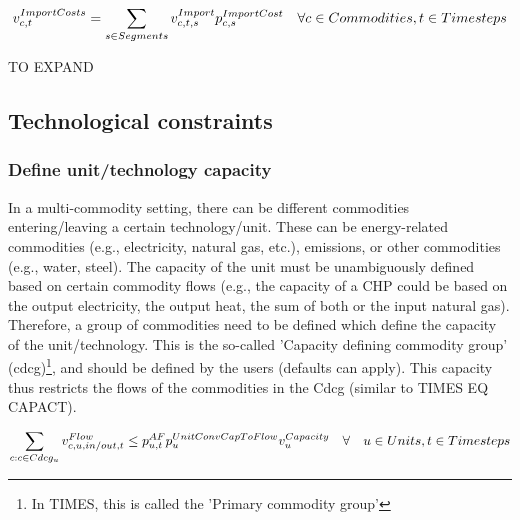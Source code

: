 \documentclass[10pt,english]{article}
\begin{document}
\begin{align}
v^{ImportCosts}_{c,t} = \sum_{s \in Segments} v^{Import}_{c,t,s} p^{ImportCost}_{c,s} \quad \forall c \in Commodities, t \in Timesteps
\end{align}

{\color{red} TO EXPAND}






\subsection{Technological constraints}

\subsubsection{Define unit/technology capacity}

In a multi-commodity setting, there can be different commodities entering/leaving a certain technology/unit. These can be energy-related commodities (e.g., electricity, natural gas, etc.), emissions, or other commodities (e.g., water, steel). The capacity of the unit must be unambiguously defined based on certain commodity flows (e.g., the capacity of a CHP could be based on the output electricity, the output heat, the sum of both or the input natural gas). Therefore, a group of commodities need to be defined which define the capacity of the unit/technology. This is the so-called 'Capacity defining commodity group' (cdcg)\footnote{In TIMES, this is called the 'Primary commodity group'}, and should be defined by the users (defaults can apply). This capacity thus restricts the flows of the commodities in the Cdcg (similar to TIMES EQ CAPACT).


\begin{equation} \label{eq:max_capacity}
\sum_{c : c \in Cdcg_{u}} v^{Flow}_{c,u,in/out,t} \le p^{AF}_{u,t} p^{UnitConvCapToFlow}_{u} v^{Capacity}_{u} \quad \forall \quad u \in Units, t \in Timesteps
\end{equation}
\end{document}
